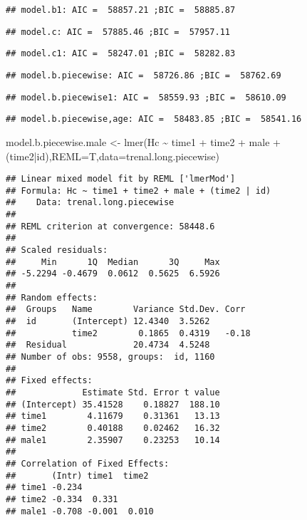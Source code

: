 \documentclass[
]{article}
\newenvironment{Shaded}{\begin{snugshade}}{\end{snugshade}}
\newcommand{\AttributeTok}[1]{\textcolor[rgb]{0.77,0.63,0.00}{#1}}
\newcommand{\FunctionTok}[1]{\textcolor[rgb]{0.00,0.00,0.00}{#1}}
\newcommand{\NormalTok}[1]{#1}
\newcommand{\OtherTok}[1]{\textcolor[rgb]{0.56,0.35,0.01}{#1}}
\newcommand{\SpecialCharTok}[1]{\textcolor[rgb]{0.00,0.00,0.00}{#1}}
\begin{document}
\begin{verbatim}
## model.b1: AIC =  58857.21 ;BIC =  58885.87
\end{verbatim}

\begin{verbatim}
## model.c: AIC =  57885.46 ;BIC =  57957.11
\end{verbatim}

\begin{verbatim}
## model.c1: AIC =  58247.01 ;BIC =  58282.83
\end{verbatim}

\begin{verbatim}
## model.b.piecewise: AIC =  58726.86 ;BIC =  58762.69
\end{verbatim}

\begin{verbatim}
## model.b.piecewise1: AIC =  58559.93 ;BIC =  58610.09
\end{verbatim}

\begin{verbatim}
## model.b.piecewise,age: AIC =  58483.85 ;BIC =  58541.16
\end{verbatim}

\begin{Shaded}
\begin{Highlighting}[]
\NormalTok{model.b.piecewise.male }\OtherTok{\textless{}{-}} \FunctionTok{lmer}\NormalTok{(Hc }\SpecialCharTok{\textasciitilde{}}\NormalTok{ time1 }\SpecialCharTok{+}\NormalTok{ time2 }\SpecialCharTok{+}\NormalTok{ male }\SpecialCharTok{+}\NormalTok{ (time2}\SpecialCharTok{|}\NormalTok{id),}\AttributeTok{REML=}\NormalTok{T,}\AttributeTok{data=}\NormalTok{trenal.long.piecewise)}
\end{Highlighting}
\end{Shaded}

\begin{verbatim}
## Linear mixed model fit by REML ['lmerMod']
## Formula: Hc ~ time1 + time2 + male + (time2 | id)
##    Data: trenal.long.piecewise
## 
## REML criterion at convergence: 58448.6
## 
## Scaled residuals: 
##     Min      1Q  Median      3Q     Max 
## -5.2294 -0.4679  0.0612  0.5625  6.5926 
## 
## Random effects:
##  Groups   Name        Variance Std.Dev. Corr 
##  id       (Intercept) 12.4340  3.5262        
##           time2        0.1865  0.4319   -0.18
##  Residual             20.4734  4.5248        
## Number of obs: 9558, groups:  id, 1160
## 
## Fixed effects:
##             Estimate Std. Error t value
## (Intercept) 35.41528    0.18827  188.10
## time1        4.11679    0.31361   13.13
## time2        0.40188    0.02462   16.32
## male1        2.35907    0.23253   10.14
## 
## Correlation of Fixed Effects:
##       (Intr) time1  time2 
## time1 -0.234              
## time2 -0.334  0.331       
## male1 -0.708 -0.001  0.010
\end{verbatim}
\end{document}
